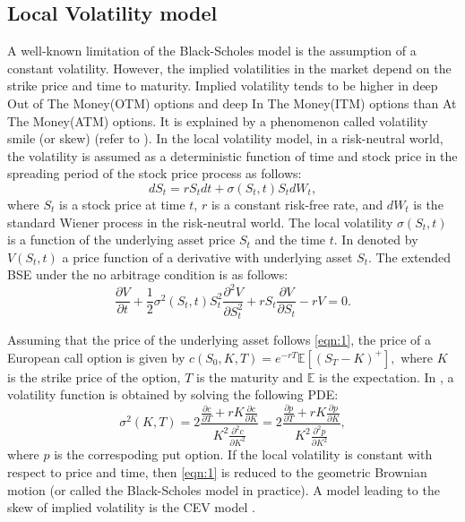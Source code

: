 \documentclass[11pt,reqno]{article}
\numberwithin{equation}{section}
\begin{document}
\subsection{Local Volatility model}
A well-known limitation of the Black-Scholes model is the assumption of a constant volatility. However, the implied volatilities in the market depend on the strike price and time to maturity. Implied volatility tends to be higher in deep Out of The Money(OTM) options and deep In The Money(ITM) options than At The Money(ATM) options. It is explained by a phenomenon called volatility smile (or skew)
 (refer to \cite{Dupire-1994, Derman-Kani-1994}).
   In the local volatility model, in a risk-neutral world, the volatility is assumed as a deterministic function of time and stock price in the spreading period of the stock price process as follows:
\begin{equation}\label{eqn:1}
    dS_t = rS_tdt + \sigma(S_t,t)S_tdW_t,
\end{equation}
where $S_t$ is a stock price at time $t$, $r$ is a constant risk-free rate, and $dW_t$ is the standard Wiener process in the risk-neutral world. 
The local volatility $\sigma(S_t,t)$ is a function of the underlying asset price $S_t$ 
and the time $t$.
In \cite{cox1976valuation} denoted by $V(S_t,t)$
 a price function of a derivative with underlying asset $S_t$.
 The extended BSE under the no arbitrage condition is as follows:
\begin{equation*}%
    \frac{\partial V}{\partial t} + \frac{1}{2} \sigma^2(S_t,t) S_t^2 \frac{\partial^2 V}{\partial S_t^2} + rS_t\frac{\partial V}{\partial S_t} - rV = 0.
\end{equation*} 

Assuming that the price of the underlying asset follows \eqref{eqn:1}, the price of a European call option is given by 
$%
    c(S_0,K,T) = e^{-rT}\mathbb{E}[(S_T-K)^+],
$ %
where $K$ is the strike price of the option, $T$ is the maturity and $\mathbb{E}$ is the expectation.
In \cite{Dupire-1994}, a volatility function is obtained by solving the following PDE:
\begin{equation}\label{eqn:4}
    \sigma^2(K,T) =
    2\frac{
    \frac{\partial c}{\partial T} + rK\frac{\partial c}{\partial K}    }
    { K^2\frac{\partial^2 c}{\partial K^2}     }
    =
    2\frac{
    \frac{\partial p}{\partial T} + rK\frac{\partial p}{\partial K}    }
    {    K^2\frac{\partial^2 p}{\partial K^2}    },
\end{equation}
where $p$ is the correspoding put option.
If the local volatility is constant with respect to price and time, then \eqref{eqn:1} is reduced to the geometric Brownian motion (or called the Black-Scholes model in practice). A model leading to the skew of implied volatility is the CEV model \cite{cox1976valuation, cox1975notes}.
\end{document}
